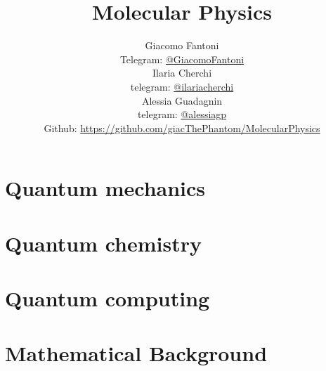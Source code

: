 

\title{\Huge \textbf{Molecular Physics}}

\author{
  Giacomo Fantoni \\
  \small Telegram: \href{https://t.me/GiacomoFantoni}{@GiacomoFantoni} \\[3pt]
  Ilaria Cherchi\\
  \small telegram: \href{https://t.me/ilariacherchi}{@ilariacherchi} \\[3pt]
  Alessia Guadagnin\\
  \small telegram: \href{https://t.me/alessiagp}{@alessiagp} \\[3pt]
\small Github: \href{https://github.com/giacThePhantom/MolecularPhysics}{https://github.com/giacThePhantom/MolecularPhysics}}

\maketitle
\tableofcontents

  \part{Quantum mechanics}

    
    
    
    

  \part{Quantum chemistry}

    
    
    

  \part{Quantum computing}


  \part{Mathematical Background}

    
    
    
    
    
    
    
    


